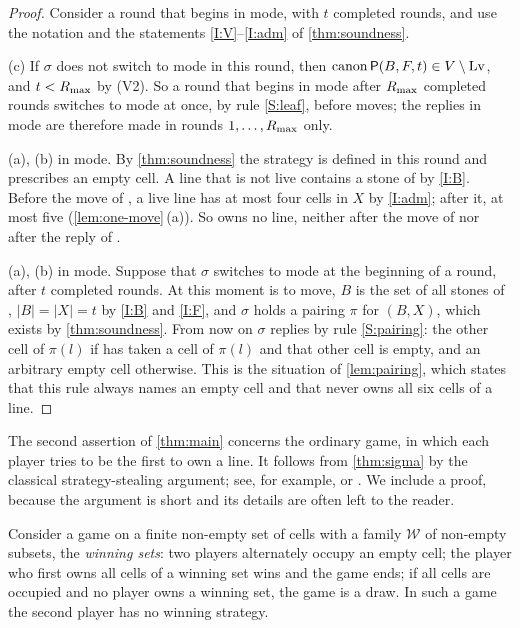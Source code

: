 \begin{proof}
Consider a round that begins in \TABLE{} mode, with $t$ completed rounds, and use the notation and the
statements \ref{I:V}--\ref{I:adm} of \cref{thm:soundness}.

(c) If $\sigma$ does not switch to \PAIRING{} mode in this round, then $\operatorname{canon}\mathsf{P}(B,F,t)\in V\setminus\mathrm{Lv}$,
and $t<R_{\max}$ by (V2). So a round that begins in \TABLE{} mode after $R_{\max}$ completed rounds switches to
\PAIRING{} mode at once, by rule \ref{S:leaf}, before \Maker{} moves; the replies in \TABLE{} mode are
therefore made in rounds $1,\dots,R_{\max}$ only.

(a), (b) in \TABLE{} mode. By \cref{thm:soundness} the strategy is defined in this round and
prescribes an empty cell. A line that is not live contains a stone of \Breaker{} by \ref{I:B}. Before the
move of \Maker, a live line has at most four cells in $X$ by \ref{I:adm}; after it, at most five
(\cref{lem:one-move}\,(a)). So \Maker{} owns no line, neither after the move of \Maker{} nor after the
reply of \Breaker.

(a), (b) in \PAIRING{} mode. Suppose that $\sigma$ switches to \PAIRING{} mode at the beginning of a round,
after $t$ completed rounds. At this moment \Maker{} is to move, $B$ is the set of all stones of \Breaker,
$|B|=|X|=t$ by \ref{I:B} and \ref{I:F}, and $\sigma$ holds a pairing $\pi$ for $(B,X)$, which exists by
\cref{thm:soundness}. From now on $\sigma$ replies by rule \ref{S:pairing}: the other cell of
$\pi(l)$ if \Maker{} has taken a cell of $\pi(l)$ and that other cell is empty, and an arbitrary empty
cell otherwise. This is the situation of \cref{lem:pairing}, which states that this rule always names
an empty cell and that \Maker{} never owns all six cells of a line.
\end{proof}

The second assertion of \cref{thm:main} concerns the ordinary game, in which each player tries to be
the first to own a line. It follows from \cref{thm:sigma} by the classical strategy-stealing argument; see, for
example, \cite{Beck2008} or \cite[Theorem~3.1]{Krivelevich2014}. We include a proof, because the argument is
short and its details are often left to the reader.

\begin{proposition}\label{prop:stealing}
Consider a game on a finite non-empty set of cells with a family $\mathcal{W}$ of non-empty subsets, the
\emph{winning sets}: two
players alternately occupy an empty cell; the player who first owns all cells of a winning set wins and the
game ends; if all cells are occupied and no player owns a winning set, the game is a draw. In such a game the
second player has no winning strategy.
\end{proposition}


